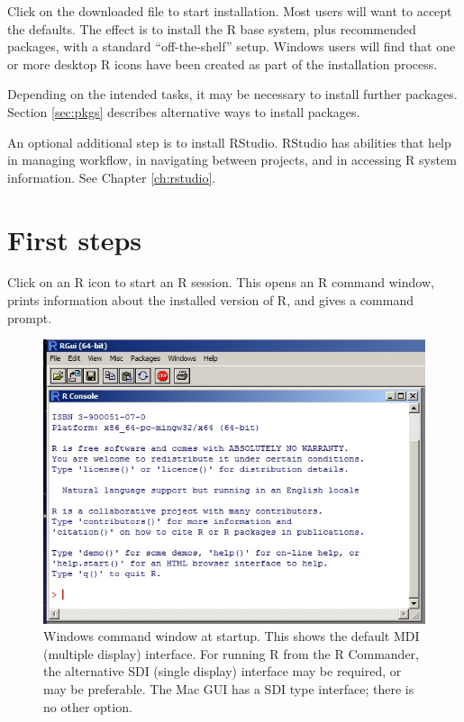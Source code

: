 Click on the downloaded file to start installation.  Most users will
want to accept the defaults.  The effect is to install the R base
system, plus recommended packages, with a standard ``off-the-shelf''
setup.  Windows users will find that one or more desktop R icons have
been created as part of the installation process.

Depending on the intended tasks, it may be necessary to install
further packages. Section \ref{sec:pkgs} describes alternative
ways to install packages.

An optional additional step is to install RStudio.
  RStudio has abilities that
help in managing workflow, in navigating between projects, and in
accessing R system information.  See Chapter \ref{ch:rstudio}.

\section{First steps}\label{sec:step1}

Click on an R icon to start an R session.  This opens an R command
window, prints information about the installed version of R, and
gives a command prompt.

\begin{figure}
\includegraphics[trim=0 18 0 0]{figs-inc/01i-gui.jpg}
\caption{Windows command window at startup. This shows the default MDI
  (multiple display) interface. For running R from the R Commander,
  the alternative SDI (single display) interface may be required, or
  may be preferable.  The Mac GUI has a SDI type interface; there is
  no other option.}
\end{figure}

